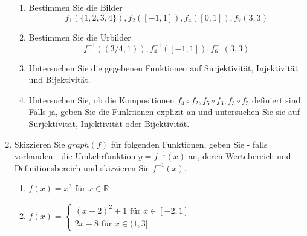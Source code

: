 \documentclass[12pt,a4paper]{scrreprt}
\newcommand{\R}{\mathds{R}}
\begin{document}
\begin{enumerate}
\begin{enumerate}
			\item Bestimmen Sie die Bilder \[f_1(\{1,2,3,4\}), f_2([-1,1]), f_4([0,1]),f_7(3,3)\]
			\item Bestimmen Sie die Urbilder \[f_1^{-1}((3/4,1)), f_4^{-1}([-1,1]),f_6^{-1}(3,3)\]
			\item Untersuchen Sie die gegebenen Funktionen auf Surjektivität, Injektivität und Bijektivität.
			\item Untersuchen Sie, ob die Kompositionen $f_4\circ f_2,  f_5\circ f_3,  f_3 \circ f_5$ definiert sind. Falls ja, geben Sie die Funktionen explizit an und untersuchen Sie sie auf Surjektivität, Injektivität oder Bijektivität.
			\end{enumerate}
\item Skizzieren Sie $graph(f)$ für folgenden Funktionen, geben Sie  - falls vorhanden - die Umkehrfunktion $y=f^{-1}(x)$ an,  deren Wertebereich und Definitionsbereich und skizzieren Sie $f^{-1}(x)$.
		\begin{enumerate}
			\item $f(x)=x^3$ für $x \in \R$
			\item $f(x)= \begin{cases}
													(x+2)^2+1 \text{ für  } x \in [-2,1] \\
													2x+8 \text{ für  } x \in (1,3]
										\end{cases}$
			\end{enumerate}
 \end{enumerate}
\end{document}
